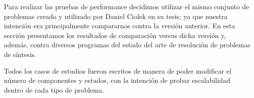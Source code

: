 
Para realizar las pruebas de performance decidimos utilizar el mismo conjunto de problemas creado y utilizado por Daniel Ciolek en su tesis; ya que nuestra intención era principalmente compararnos contra la versión anterior. En esta sección presentamos los resultados de comparación versus dicha versión y, además, contra diversos programas del estado del arte de resolución de problemas de síntesis.

Todos los casos de estudios fueron escritos de manera de poder modificar el número de componentes y estados, con la intención de probar escalabilidad dentro de cada tipo de problema.
